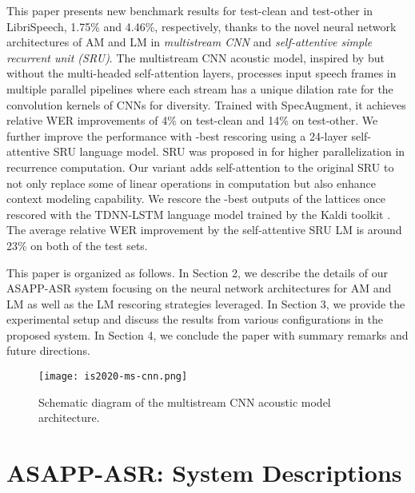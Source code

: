\documentclass[a4paper]{article}
\begin{document}
This paper presents new benchmark results for test-clean and test-other in LibriSpeech, 1.75\% and 4.46\%, respectively, thanks to the novel neural network architectures of AM and LM in \textit{multistream CNN} \cite{han20} and \textit{self-attentive simple recurrent unit (SRU)}. 
The multistream CNN acoustic model, inspired by \cite{han19-2} but without the multi-headed self-attention layers, processes input speech frames in multiple parallel pipelines where each stream has a unique dilation rate for the convolution kernels of CNNs for diversity. Trained with SpecAugment, it achieves relative WER improvements of 4\% on test-clean and 14\% on test-other. We further improve the performance with -best rescoring using a 24-layer self-attentive SRU language model. SRU was proposed in \cite{lei18} for higher parallelization in recurrence computation. Our variant adds self-attention to the original SRU to not only replace some of linear operations in computation but also enhance context modeling capability. We rescore the -best outputs of the lattices once rescored with the TDNN-LSTM language model trained by the Kaldi toolkit \cite{Povey11,Li2018}. The average relative WER improvement by the self-attentive SRU LM is around 23\% on both of the test sets. 

This paper is organized as follows. In Section 2, we describe the details of our ASAPP-ASR system focusing on the neural network architectures for AM and LM as well as the LM rescoring strategies leveraged. In Section 3, we provide the experimental setup and discuss the results from various configurations in the proposed system. In Section 4, we conclude the paper with summary remarks and future directions.

\begin{figure}[t]
  \centering
  \texttt{[image: is2020-ms-cnn.png]}
  \caption{Schematic diagram of the multistream CNN acoustic model architecture.}
  \label{fig:speech_production}
\end{figure}


\section{ASAPP-ASR: System Descriptions}
\end{document}
